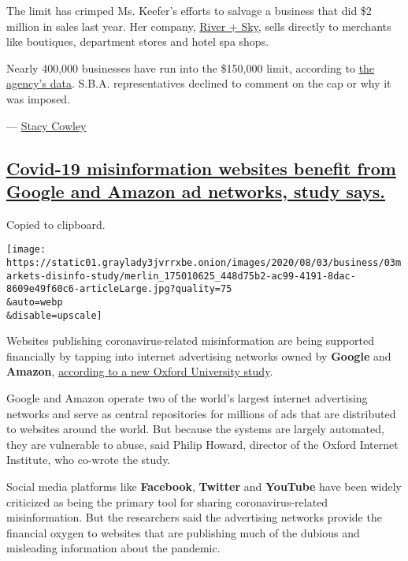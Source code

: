 The limit has crimped Ms. Keefer's efforts to salvage a business that
did \$2 million in sales last year. Her company,
\href{https://www.riverandskycalifornia.com/}{River + Sky}, sells
directly to merchants like boutiques, department stores and hotel spa
shops.

Nearly 400,000 businesses have run into the \$150,000 limit, according
to
\href{https://www.sba.gov/funding-programs/loans/coronavirus-relief-options/economic-injury-disaster-loans\#section-header-5}{the
agency's data}. S.B.A. representatives declined to comment on the cap or
why it was imposed.

--- \href{https://www.nytimes3xbfgragh.onion/by/stacy-cowley}{Stacy
Cowley}

\hypertarget{covid-19-misinformation-websites-benefit-from-google-and-amazon-ad-networks-study-says}{%
\subsection{\texorpdfstring{\protect\hyperlink{covid-19-misinformation-websites-benefit-from-google-and-amazon-ad-networks-study-says}{Covid-19
misinformation websites benefit from Google and Amazon ad networks,
study
says.}}{Covid-19 misinformation websites benefit from Google and Amazon ad networks, study says.}}\label{covid-19-misinformation-websites-benefit-from-google-and-amazon-ad-networks-study-says}}

Copied to clipboard.

\texttt{[image: https://static01.graylady3jvrrxbe.onion/images/2020/08/03/business/03markets-disinfo-study/merlin\_175010625\_448d75b2-ac99-4191-8dac-8609e49f60c6-articleLarge.jpg?quality=75\\\&auto=webp\\\&disable=upscale]}

Websites publishing coronavirus-related misinformation are being
supported financially by tapping into internet advertising networks
owned by \textbf{Google} and \textbf{Amazon},
\href{https://comprop.oii.ox.ac.uk/research/covid19-disinfo-seo/}{according
to a new Oxford University study}.

Google and Amazon operate two of the world's largest internet
advertising networks and serve as central repositories for millions of
ads that are distributed to websites around the world. But because the
systems are largely automated, they are vulnerable to abuse, said Philip
Howard, director of the Oxford Internet Institute, who co-wrote the
study.

Social media platforms like \textbf{Facebook}, \textbf{Twitter} and
\textbf{YouTube} have been widely criticized as being the primary tool
for sharing coronavirus-related misinformation. But the researchers said
the advertising networks provide the financial oxygen to websites that
are publishing much of the dubious and misleading information about the
pandemic.

